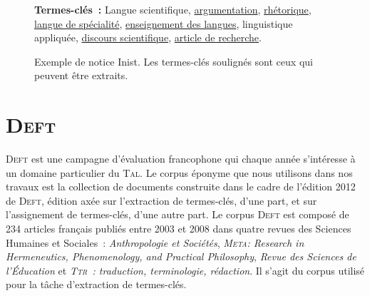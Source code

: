 \begin{figure}
{{          \textbf{Termes-clés~:} Langue scientifique, \underline{argumentation},
          \underline{rhétorique}, \underline{langue de spécialité},
          \underline{enseignement des langues}, linguistique appliquée,
          \underline{discours scientifique}, \underline{article de recherche}. 
        }
      }
%
%
      \caption[Exemple de notice Inist]{
        Exemple de notice Inist. Les termes-clés soulignés sont ceux qui peuvent
        être extraits.
        \label{fig:exemple_notice_inist}
      }
    \end{figure}


  \section[\textsc{Deft}]{\textsc{Deft}~\textnormal{\large\cite{paroubek2012deft}}}
  \label{sec:main-data_description-deft_data}
    \textsc{Deft} est une campagne d'évaluation francophone qui chaque année
    s'intéresse à un domaine particulier du \textsc{Tal}. Le corpus éponyme que
    nous utilisons dans nos travaux est la collection de documents construite
    dans le cadre de l'édition 2012 de \textsc{Deft}, édition axée sur
    l'extraction de termes-clés, d'une part, et sur l'assignement de
    termes-clés, d'une autre part. Le corpus \textsc{Deft} est composé de 234
    articles français publiés entre 2003 et 2008 dans quatre revues des Sciences
    Humaines et Sociales~: \textit{Anthropologie et Sociétés},
    \textit{\textsc{Meta}: Research in Hermeneutics, Phenomenology, and
    Practical Philosophy}, \textit{Revue des Sciences de l'Éducation} et
    \textit{\textsc{Ttr}~: traduction, terminologie, rédaction}. Il s'agit du
    corpus utilisé pour la tâche d'extraction de termes-clés.
    

